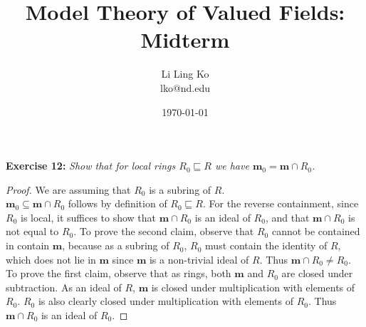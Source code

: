 \documentclass{article}
\begin{document}
\title{Model Theory of Valued Fields: Midterm}
\author{Li Ling Ko\\ lko@nd.edu}
\date{\today}
\maketitle

\textbf{Exercise 12:} \it Show that for local rings $R_0\sqsubseteq R$ we
  have $\bm{m}_0=\bm{m}\cap R_0$.

  \begin{proof}
    We are assuming that $R_0$ is a subring of $R$. \\

    $\bm{m}_0\subseteq\bm{m}\cap R_0$ follows by definition of
    $R_0\sqsubseteq R$. For the reverse containment, since $R_0$ is local,
    it suffices to show that $\bm{m}\cap R_0$ is an ideal of $R_0$, and
    that $\bm{m}\cap R_0$ is not equal to $R_0$. To prove the second
    claim, observe that $R_0$ cannot be contained in contain $\bm{m}$,
    because as a subring of $R_0$, $R_0$ must contain the identity of $R$,
    which does not lie in $\bm{m}$ since $\bm{m}$ is a non-trivial ideal of
    $R$. Thus $\bm{m}\cap R_0\neq R_0$. \\ 

    To prove the first claim, observe that as rings, both $\bm{m}$
    and $R_0$ are closed under subtraction. As an ideal of $R$, $\bm{m}$ is
    closed under multiplication with elements of $R_0$. $R_0$ is also
    clearly closed under multiplication with elements of $R_0$. Thus
    $\bm{m}\cap R_0$ is an ideal of $R_0$.
  \end{proof}
\end{document}
